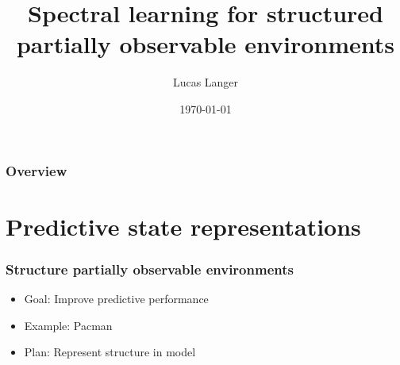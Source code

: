 \documentclass{beamer}
\title[Spectral learning with structure]{Spectral learning for structured partially observable environments} %
\author{Lucas Langer} %
\institute[McGill University] %
{
McGill University \\ %
\medskip
\textit{lucas.langer@mail.mcgill.ca} %
}
\date{\today} %
\begin{document}
\begin{frame}
\titlepage %
\end{frame}

\begin{frame}
\frametitle{Overview} %
\tableofcontents %
\end{frame}


\section{Predictive state representations} %



\begin{frame}
\frametitle{Structure partially observable environments}

\begin{itemize}
\item Goal: Improve predictive performance
\item Example: Pacman
\item Plan: Represent structure in model

\end{itemize}

\end{frame}
\end{document}
